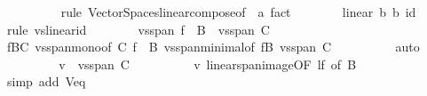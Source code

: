 \begin{isabellebody}
\ \ \ \ \ \ \ \ \isamarkupfalse%
\ {\isacharparenleft}{\kern0pt}rule\ Vector{\isacharunderscore}{\kern0pt}Spaces{\isachardot}{\kern0pt}linear{\isacharunderscore}{\kern0pt}compose{\isacharbrackleft}{\kern0pt}of\ {\isacharunderscore}{\kern0pt}\ {\isachardoublequoteopen}{\isacharparenleft}{\kern0pt}{\isacharasterisk}{\kern0pt}a{\isacharparenright}{\kern0pt}{\isachardoublequoteclose}{\isacharbrackright}{\kern0pt}{\isacharparenright}{\kern0pt}\ fact{\isacharplus}{\kern0pt}\isanewline
\ \ \ \ \ \ \isamarkupfalse%
\ {\isachardoublequoteopen}linear\ {\isacharparenleft}{\kern0pt}{\isacharasterisk}{\kern0pt}b{\isacharparenright}{\kern0pt}\ {\isacharparenleft}{\kern0pt}{\isacharasterisk}{\kern0pt}b{\isacharparenright}{\kern0pt}\ id{\isachardoublequoteclose}\ \isamarkupfalse%
\ {\isacharparenleft}{\kern0pt}rule\ vs{}{\isachardot}{\kern0pt}linear{\isacharunderscore}{\kern0pt}id{\isacharparenright}{\kern0pt}\isanewline
\ \ \ \ \ \ \isamarkupfalse%
\ {\isachardoublequoteopen}vs{}{\isachardot}{\kern0pt}span\ {\isacharparenleft}{\kern0pt}f\ {\isacharbackquote}{\kern0pt}\ B{\isacharparenright}{\kern0pt}\ {\isacharequal}{\kern0pt}\ vs{}{\isachardot}{\kern0pt}span\ C{\isachardoublequoteclose}\isanewline
\ \ \ \ \ \ \ \ \isamarkupfalse%
\ fB{\isacharunderscore}{\kern0pt}C\ vs{}{\isachardot}{\kern0pt}span{\isacharunderscore}{\kern0pt}mono{\isacharbrackleft}{\kern0pt}of\ C\ {\isachardoublequoteopen}f\ {\isacharbackquote}{\kern0pt}\ B{\isachardoublequoteclose}{\isacharbrackright}{\kern0pt}\ vs{}{\isachardot}{\kern0pt}span{\isacharunderscore}{\kern0pt}minimal{\isacharbrackleft}{\kern0pt}of\ {\isachardoublequoteopen}f{\isacharbackquote}{\kern0pt}B{\isachardoublequoteclose}\ {\isachardoublequoteopen}vs{}{\isachardot}{\kern0pt}span\ C{\isachardoublequoteclose}{\isacharbrackright}{\kern0pt}\isanewline
\ \ \ \ \ \ \ \ \isamarkupfalse%
\ auto\isanewline
\ \ \ \ \ \ \isamarkupfalse%
\ \isamarkupfalse%
\ {\isachardoublequoteopen}v\ {\isasymin}\ vs{}{\isachardot}{\kern0pt}span\ C{\isachardoublequoteclose}\isanewline
\ \ \ \ \ \ \ \ \isamarkupfalse%
\ v\ linear{\isacharunderscore}{\kern0pt}span{\isacharunderscore}{\kern0pt}image{\isacharbrackleft}{\kern0pt}OF\ lf{\isacharcomma}{\kern0pt}\ of\ B{\isacharbrackright}{\kern0pt}\ \isamarkupfalse%
\ {\isacharparenleft}{\kern0pt}simp\ add{\isacharcolon}{\kern0pt}\ V{\isacharunderscore}{\kern0pt}eq{\isacharparenright}{\kern0pt}\isanewline

\end{isabellebody}
